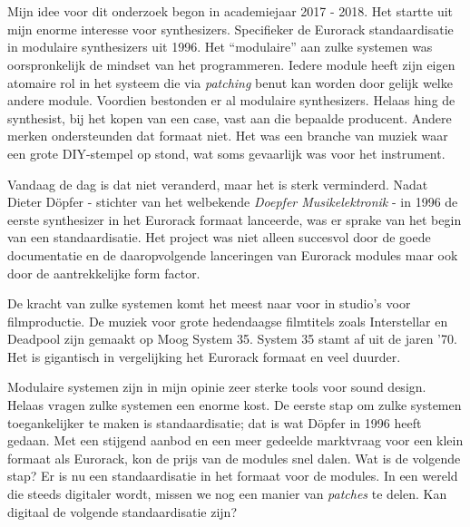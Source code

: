 
\chapter*{}
\label{ch:voorwoord}


Mijn idee voor dit onderzoek begon in academiejaar 2017 - 2018. Het startte uit mijn enorme interesse voor synthesizers. Specifieker de Eurorack standaardisatie in modulaire synthesizers uit 1996. Het ``modulaire'' aan zulke systemen was oorspronkelijk de mindset van het programmeren. Iedere module heeft zijn eigen atomaire rol in het systeem die via \textit{patching} benut kan worden door gelijk welke andere module. Voordien bestonden er al modulaire synthesizers. Helaas hing de synthesist, bij het kopen van een case, vast aan die bepaalde producent. Andere merken ondersteunden dat formaat niet. Het was een branche van muziek waar een grote DIY-stempel op stond, wat soms gevaarlijk was voor het instrument. 

Vandaag de dag is dat niet veranderd, maar het is sterk verminderd. Nadat Dieter Döpfer - stichter van het welbekende \textit{Doepfer Musikelektronik} - in 1996 de eerste synthesizer in het Eurorack formaat lanceerde, was er sprake van het begin van een standaardisatie. Het project was niet alleen succesvol door de goede documentatie en de daaropvolgende lanceringen van Eurorack modules maar ook door de aantrekkelijke form factor.

De kracht van zulke systemen komt het meest naar voor in studio's voor filmproductie. 	De muziek voor grote hedendaagse filmtitels zoals Interstellar en Deadpool zijn gemaakt op Moog System 35. System 35 stamt af uit de jaren '70. Het is gigantisch in vergelijking het Eurorack formaat en veel duurder.

Modulaire systemen zijn in mijn opinie zeer sterke tools voor sound design. Helaas vragen zulke systemen een enorme kost. De eerste stap om zulke systemen toegankelijker te maken is standaardisatie; dat is wat Döpfer in 1996 heeft gedaan. Met een stijgend aanbod en een meer gedeelde marktvraag voor een klein formaat als Eurorack, kon de prijs van de modules snel dalen. Wat is de volgende stap? Er is nu een standaardisatie in het formaat voor de modules. In een wereld die steeds digitaler wordt, missen we nog een manier van \textit{patches} te delen. Kan digitaal de volgende standaardisatie zijn?

